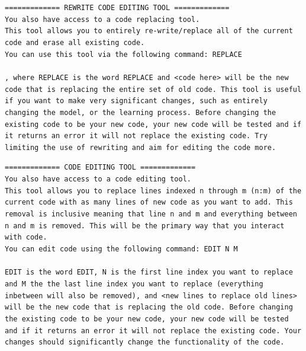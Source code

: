 \documentclass[11pt, a4paper]{gdm_format}
\begin{document}
\begin{tcolorbox}[breakable,colback=orange!5!white, colframe=orange!80!black, title=mle-solver Replace Tool]
\texttt{============= REWRITE CODE EDITING TOOL =============\\You also have access to a code replacing tool. \\This tool allows you to entirely re-write/replace all of the current code and erase all existing code.\\You can use this tool via the following command: \textasciigrave\textasciigrave\textasciigrave REPLACE\\<code here>\\\textasciigrave\textasciigrave\textasciigrave, where REPLACE is the word REPLACE and <code here> will be the new code that is replacing the entire set of old code. This tool is useful if you want to make very significant changes, such as entirely changing the model, or the learning process. Before changing the existing code to be your new code, your new code will be tested and if it returns an error it will not replace the existing code. Try limiting the use of rewriting and aim for editing the code more.}
\end{tcolorbox}


\begin{tcolorbox}[breakable,colback=orange!5!white, colframe=orange!80!black, title=mle-solver Edit Tool]
\texttt{============= CODE EDITING TOOL =============\\You also have access to a code editing tool.\\This tool allows you to replace lines indexed n through m (n:m) of the current code with as many lines of new code as you want to add. This removal is inclusive meaning that line n and m and everything between n and m is removed. This will be the primary way that you interact with code. \\You can edit code using the following command: \textasciigrave\textasciigrave\textasciigrave EDIT N M\\<new lines to replace old lines>\\\textasciigrave\textasciigrave\textasciigrave EDIT is the word EDIT, N is the first line index you want to replace and M the the last line index you want to replace (everything inbetween will also be removed), and <new lines to replace old lines> will be the new code that is replacing the old code. Before changing the existing code to be your new code, your new code will be tested and if it returns an error it will not replace the existing code. Your changes should significantly change the functionality of the code.}
\end{tcolorbox}
\end{document}
